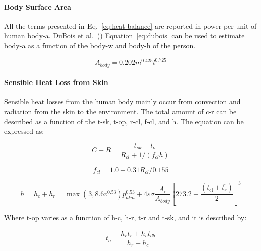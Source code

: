 \paragraph{Body Surface Area}

All the terms presented in Eq.~\ref{eq:heat-balance} are reported in power per unit of human \ac{body-a}.
DuBois et al.~(\citeyear{DuBois}) Equation~\ref{eq:dubois} can be used to estimate \ac{body-a} as a function of the \ac{body-w} and \ac{body-h} of the person.

\begin{equation}
    A_{body} = 0.202 m^{0.425} l^{0.725}\label{eq:dubois}
\end{equation}


\paragraph{Sensible Heat Loss from Skin}

Sensible heat losses from the human body mainly occur from convection and radiation from the skin to the environment.
The total amount of \ac{c-r} can be described as a function of the \ac{t-sk}, \ac{t-op}, \ac{r-cl}, \ac{f-cl}, and \ac{h}.
The equation can be expressed as:

\begin{equation}
    C+R=\frac{t_{s k}-t_{o}}{R_{c l}+1 /\left(f_{c l} h\right)}\label{eq:c-r}
\end{equation}

\begin{equation}
    f_{cl}=1.0 + 0.31 R_{cl} / 0.155\label{eq:f-cl}
\end{equation}

\begin{equation}
    h=h_{c} + h_{r} = \max(3, 8.6 v^{0.53}) p_{atm}^{0.53} + 4 \varepsilon \sigma \frac{A_{\mathrm{r}}}{A_{body}}\left[273.2+\frac{\left(t_{\mathrm{cl}}+\overline{t_{r}}\right)}{2}\right]^{3}\label{eq:h}
\end{equation}


Where \ac{t-op} varies as a function of \ac{h-c}, \ac{h-r}, \ac{t-r} and \ac{t-sk}, and it is described by:

\begin{equation}
    t_{o}=\frac{h_{r} \bar{t}_{r}+h_{c} t_{db}}{h_{r}+h_{c}}\label{eq:t-op}
\end{equation}


